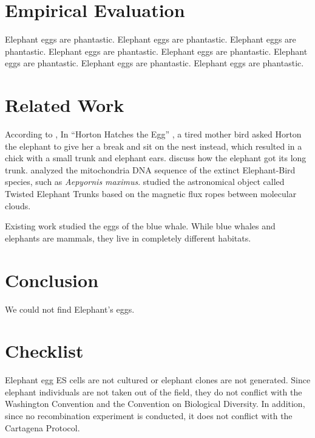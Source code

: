 \section{Empirical Evaluation}

Elephant eggs are phantastic.
Elephant eggs are phantastic.
Elephant eggs are phantastic.
Elephant eggs are phantastic.
Elephant eggs are phantastic.
Elephant eggs are phantastic.
Elephant eggs are phantastic.
Elephant eggs are phantastic.

\section{Related Work}

According to \citet{folbre1997future},
In ``Horton Hatches the Egg'' \cite{seuss1968horton},
a tired mother bird asked Horton the elephant to give her a break and
sit on the nest instead, which resulted in a chick with a small trunk and
elephant ears.
\citet{kipling1983elephant} discuss how the elephant got its long trunk.
\citet{cooper2001complete} analyzed the mitochondria DNA sequence of the extinct Elephant-Bird species,
such as \emph{Aepyornis maximus}.
\citet{carlqvist2003theory} studied the astronomical object called Twisted Elephant Trunks
based on the magnetic flux ropes between molecular clouds.

Existing work studied the eggs of the blue whale.
While blue whales and elephants are mammals, they live in completely different habitats.

\section{Conclusion}

We could not find Elephant's eggs.

\section*{Checklist}

Elephant egg ES cells are not cultured or elephant clones are not
generated. Since elephant individuals are not taken out of the field,
they do not conflict with the Washington Convention and the Convention
on Biological Diversity. In addition, since no recombination experiment
is conducted, it does not conflict with the Cartagena Protocol.

